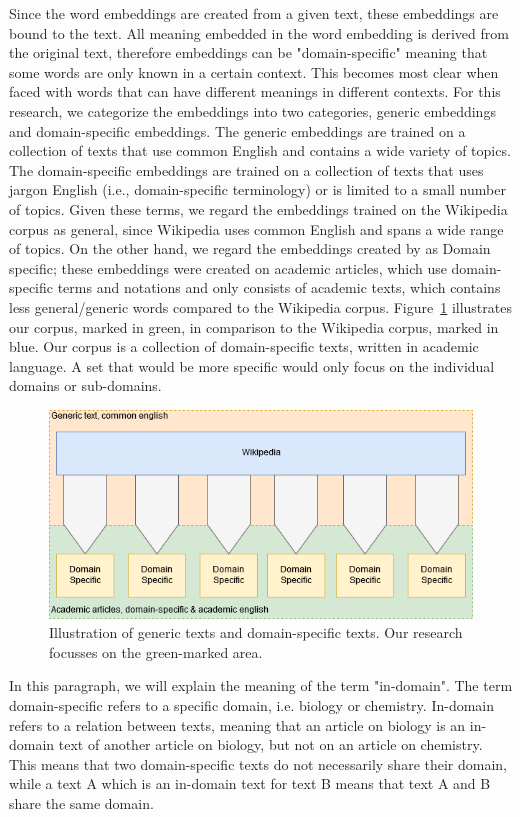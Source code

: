 \documentclass[../../Thesis.tex]{subfiles}
\begin{document}
Since the word embeddings are created from a given text, these embeddings are bound to the text. All meaning embedded in the word embedding is derived from the original text, therefore embeddings can be "domain-specific" meaning that some words are only known in a certain context. This becomes most clear when faced with words that can have different meanings in different contexts. For this research, we categorize the embeddings into two categories, generic embeddings and domain-specific embeddings. The generic embeddings are trained on a collection of texts that use common English and contains a wide variety of topics. The domain-specific embeddings are trained on a collection of texts that uses jargon English (i.e., domain-specific terminology) or is limited to a small number of topics. Given these terms, we regard the embeddings trained on the Wikipedia corpus\cite{lai2016generate, pennington2014glove, dai2015document, lau2016empirical, schnabel2015evaluation} as general, since Wikipedia uses common English and spans a wide range of topics. On the other hand, we regard the embeddings created by \citet{Truong2017Thesis} as Domain specific; these embeddings were created on academic articles, which use domain-specific terms and notations and only consists of academic texts, which contains less general/generic words compared to the Wikipedia corpus. Figure~\ref{figure:domainPlot} illustrates our corpus, marked in green, in comparison to the Wikipedia corpus, marked in blue. Our corpus is a collection of domain-specific texts, written in academic language. A set that would be more specific would only focus on the individual domains or sub-domains.
\begin{figure}[hbt]
\begin{center}
\includegraphics[width=4.5in]{Plots/domain_specification_graph}
\caption{Illustration of generic texts and domain-specific texts. Our research focusses on the green-marked area.}\label{figure:domainPlot}
\end{center}
\end{figure}
In this paragraph, we will explain the meaning of the term "in-domain". The term domain-specific refers to a specific domain, i.e. biology or chemistry. In-domain refers to a relation between texts, meaning that an article on biology is an in-domain text of another article on biology, but not on an article on chemistry. This means that two domain-specific texts do not necessarily share their domain, while a text A which is an in-domain text for text B means that text A and B share the same domain.
\end{document}
